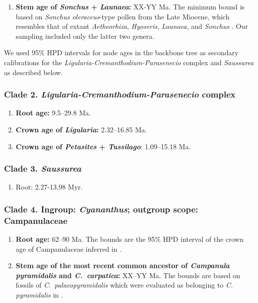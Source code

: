 \documentclass[10pt]{article}
\begin{document}
\begin{enumerate}
\item \textbf{Stem age of \textit{Sonchus} + \textit{Launaea}:}
  \colorbox{yellow!30}{XX-YY} Ma. The minimum bound is based on
  \textit{Sonchus oleraceus}-type pollen from the Late Miocene, which
  resembles that of extant \textit{Aetheorhiza}, \textit{Hyoseris},
  \textit{Launaea}, and \textit{Sonchus} \citep{Blackmore1986}. Our
  sampling included only the latter two genera.

\end{enumerate}

\noindent We used 95\% HPD intervals for node ages in the backbone
tree as secondary calibrations for the
\textit{Ligularia-Cremanthodium-Parasenecio} complex and
\textit{Saussurea} as described below.

\subsubsection*{Clade 2. \textit{Ligularia-Cremanthodium-Parasenecio} complex}

\begin{enumerate}

\item \textbf{Root age:} 9.5--29.8 Ma.

\item \textbf{Crown age of \textit{Ligularia}:} 2.32--16.85 Ma.

\item \textbf{Crown age of \textit{Petasites} + \textit{Tussilago}}:
  1.09--15.18 Ma.

\end{enumerate}

\subsubsection*{Clade 3. \textit{Saussurea}}

\begin{enumerate}
\item Root: 2.27-13.98 Myr. %
\end{enumerate}

\subsubsection*{Clade 4. Ingroup: \textit{Cyananthus}; outgroup scope: Campanulaceae}

\begin{enumerate}

\item \textbf{Root age:} 62--90 Ma. The bounds are the 95\% HPD
  interval of the crown age of Campanulaceae inferred in
  \cite{Magallon2015}.

\item \textbf{Stem age of the most recent common ancestor of
    \textit{Campanula pyramidalis} and \textit{C.~carpatica}:} XX--YY
  Ma. The bounds are based on fossils of \textit{C.~palaeopyramidalis}
  \citep{Lancucka-Srodoniowa1979} which were evaluated as belonging to
  \textit{C. pyramidalis} in \cite{Cellinese2009}.
\end{enumerate}
\end{document}
